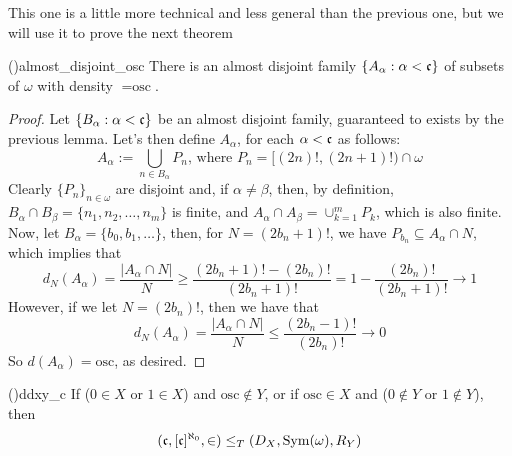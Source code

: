 This one is a little more technical and less general than the previous one, but we will use it to prove the next theorem

\begin{lemma}{(\cite{brech})}{almost_disjoint_osc}
    There is an almost disjoint family $\{A_\alpha:\alpha<\mathfrak{c}\}$ of subsets of $\omega$ with density $=\text{osc}$.
\end{lemma}

\begin{proof}
    Let $\{B_\alpha:\alpha<\mathfrak{c}\}$ be an almost disjoint family, guaranteed to exists by the previous lemma. Let's then define $A_\alpha$, for each $\alpha<\mathfrak{c}$ as follows:
    $$A_\alpha:=\bigcup_{n\in B_\alpha}P_n\text{, where }P_n=[(2n)!,(2n+1)!)\cap\omega$$
    Clearly $\{P_n\}_{n\in\omega}$ are disjoint and, if $\alpha\neq\beta$, then, by definition, $B_\alpha\cap B_\beta=\{n_1,n_2,\dots,n_m\}$ is finite, and $A_\alpha\cap A_\beta=\cup_{k=1}^mP_k$, which is also finite. Now, let $B_\alpha=\{b_0,b_1,\dots\}$, then, for $N=(2b_n+1)!$, we have $P_{b_n}\subseteq A_\alpha\cap N$, which implies that
    $$d_N(A_\alpha)=\frac{\lvert A_\alpha\cap N\rvert}N\geq\frac{(2b_n+1)!-(2b_n)!}{(2b_n+1)!}=1-\frac{(2b_n)!}{(2b_n+1)!}\to 1$$
    However, if we let $N=(2b_n)!$, then we have that
    $$d_N(A_\alpha)=\frac{\lvert A_\alpha\cap N\rvert}{N}\leq\frac{(2b_n-1)!}{(2b_n)!}\to0$$
    So $d(A_\alpha)=\text{osc}$, as desired.
\end{proof}

\begin{theorem}{(\cite{brech})}{ddxy_c}
    If ($0\in X$ or $1\in X$) and $\text{osc}\notin Y$, or if $\text{osc}\in X$ and ($0\notin Y$ or $1\notin Y$), then
    $$(\mathfrak{c},[\mathfrak{c}]^{\aleph_0},\in)\leq_T(D_X,\mathrm{Sym}(\omega),R_Y)$$
\end{theorem}

